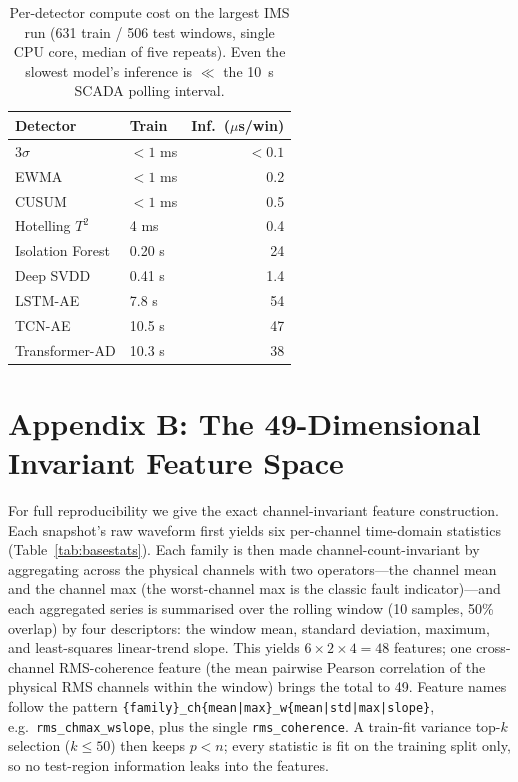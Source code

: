 \documentclass[IJPHM, 2026, 0]{PHMSociety}
\begin{document}
\begin{table}[t] \small
	\begin{center}
	\caption{Per-detector compute cost on the largest IMS run (631 train / 506 test windows, single CPU core, median of five repeats). Even the slowest model's inference is $\ll$ the 10~s SCADA polling interval.}
	\label{tab:compute}
	\begin{tabular}{l l r}
		\hline \hline
		\textbf{Detector} & \textbf{Train} & \textbf{Inf.\ ($\mu$s/win)} \\
		\hline
		$3\sigma$ & $<1$ ms & $<0.1$ \\
		EWMA & $<1$ ms & 0.2 \\
		CUSUM & $<1$ ms & 0.5 \\
		Hotelling $T^2$ & 4 ms & 0.4 \\
		Isolation Forest & 0.20 s & 24 \\
		Deep SVDD & 0.41 s & 1.4 \\
		LSTM-AE & 7.8 s & 54 \\
		TCN-AE & 10.5 s & 47 \\
		Transformer-AD & 10.3 s & 38 \\
		\hline \hline
	\end{tabular}
	\end{center}
\end{table}

\FloatBarrier
\section*{Appendix B: The 49-Dimensional Invariant Feature Space}
For full reproducibility we give the exact channel-invariant feature construction. Each snapshot's raw waveform first yields six per-channel time-domain statistics (Table~\ref{tab:basestats}). Each family is then made channel-count-invariant by aggregating across the physical channels with two operators---the channel mean and the channel max (the worst-channel max is the classic fault indicator)---and each aggregated series is summarised over the rolling window (10 samples, 50\% overlap) by four descriptors: the window mean, standard deviation, maximum, and least-squares linear-trend slope. This yields $6 \times 2 \times 4 = 48$ features; one cross-channel RMS-coherence feature (the mean pairwise Pearson correlation of the physical RMS channels within the window) brings the total to 49. Feature names follow the pattern \texttt{\{family\}\_ch\{mean|max\}\_w\{mean|std|max|slope\}}, e.g.\ \texttt{rms\_chmax\_wslope}, plus the single \texttt{rms\_coherence}. A train-fit variance top-$k$ selection ($k \le 50$) then keeps $p < n$; every statistic is fit on the training split only, so no test-region information leaks into the features.
\end{document}
